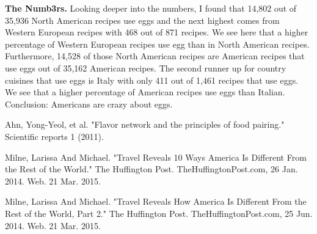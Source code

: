 \documentclass[14pt]{extarticle}
\begin{document}
\raggedright

\vspace{5mm}
\textbf{The Numb3rs.} Looking deeper into the numbers, I found that 14,802 out of 35,936 North American recipes use eggs and the next highest comes from Western European recipes with 468 out of 871 recipes. We see here that a higher percentage of Western European recipes use egg than in North American recipes. Furthermore,  14,528 of those North American recipes are American recipes that use eggs out of 35,162 American recipes. The second runner up for country cuisines that use eggs is Italy with only 411 out of 1,461 recipes that use eggs. We see that a higher percentage of American recipes use eggs than Italian. Conclusion: Americans are crazy about eggs.

\begin{thebibliography}{}

\bibitem{} Ahn, Yong-Yeol, et al. "Flavor network and the principles of food pairing." Scientific reports 1 (2011).

\bibitem{} Milne, Larissa And Michael. "Travel Reveals 10 Ways America Is Different From the Rest of the World." The Huffington Post. TheHuffingtonPost.com, 26 Jan. 2014. Web. 21 Mar. 2015.

\bibitem{} Milne, Larissa And Michael. "Travel Reveals How America Is Different From the Rest of the World, Part 2." The Huffington Post. TheHuffingtonPost.com, 25 Jun. 2014. Web. 21 Mar. 2015.

\end{thebibliography}
\end{document}
